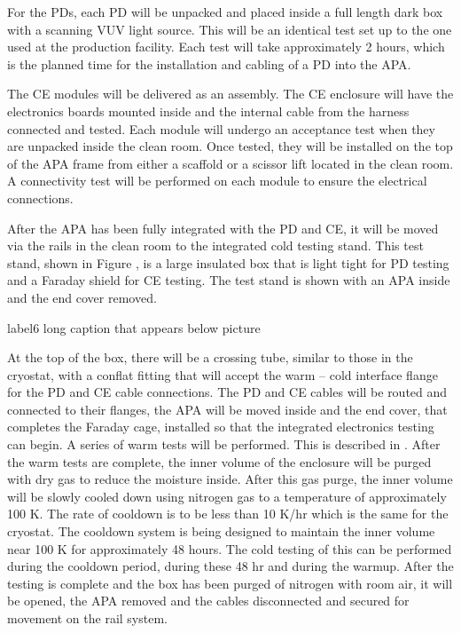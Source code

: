 For the PDs, each PD will be unpacked and placed inside a full length dark box with a scanning VUV light source. This will be an identical test set up to the one used at the production facility.  Each test will take approximately 2 hours, which is the planned time for the installation and cabling of a PD into the APA.  

The CE modules will be delivered as an assembly.  The CE enclosure will have the electronics boards mounted inside and the internal cable from the harness connected and tested.  Each module will undergo an acceptance test when they are unpacked inside the clean room.  Once tested, they will be installed on the top of the APA frame from either a scaffold or a scissor lift located in the clean room.  A connectivity test will be performed on each module to ensure the electrical connections.  

After the APA has been fully integrated with the PD and CE, it will be moved via the rails in the clean room to the integrated cold testing stand.  This test stand, shown in Figure , is a large insulated box that is light tight for PD testing and a Faraday shield for CE testing.  The test stand is shown with an APA inside and the end cover removed.  
%
\begin{cdrfigure}{label}{6 long caption that appears below picture}
\end{cdrfigure}
%
At the top of the box, there will be a crossing tube, similar to those in the cryostat, with a conflat fitting that will accept the warm – cold interface flange for the PD and CE cable connections.  The PD and CE cables will be routed and connected to their flanges, the APA will be moved inside and the end cover, that completes the Faraday cage, installed so that the integrated electronics testing can begin.  A series of warm tests will be performed.  This is described in .  After the warm tests are complete, the inner volume of the enclosure will be purged with dry gas to reduce the moisture inside.  After this gas purge, the inner volume will be slowly cooled down using nitrogen gas to a temperature of approximately 100 K.  The rate of cooldown is to be less than 10 K/hr which is the same for the cryostat.  The cooldown system is being designed to maintain the inner volume near 100 K for approximately 48 hours.  The cold testing of this can be performed during the cooldown period, during these 48 hr and during the warmup.  After the testing is complete and the box has been purged of nitrogen with room air, it will be opened, the APA removed and the cables disconnected and secured for movement on the rail system.   

